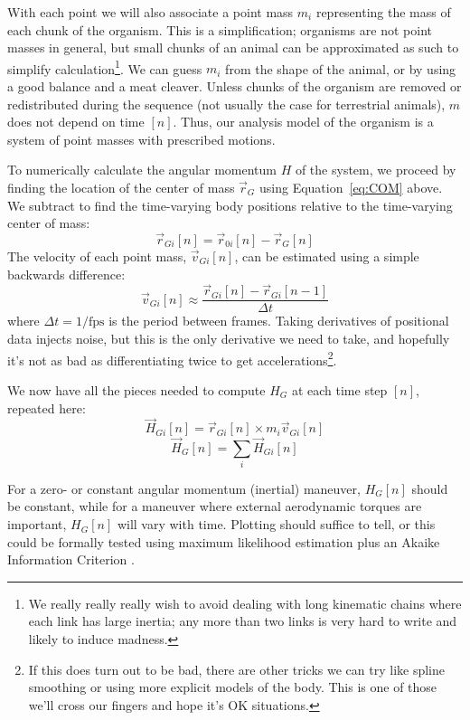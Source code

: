 \documentclass{amsart}
\begin{document}
With each point we will also associate a point mass $m_i$ representing the mass of each chunk of the organism. This is a simplification; organisms are not point masses in general, but small chunks of an animal can be approximated as such to simplify calculation\footnote{We really really really wish to avoid dealing with long kinematic chains where each link has large inertia; any more than two links is very hard to write and likely to induce madness.}. We can guess $m_i$ from the shape of the animal, or by using a good balance and a meat cleaver. Unless chunks of the organism are removed or redistributed during the sequence (not usually the case for terrestrial animals), $m$ does not depend on time $[n]$. Thus, our analysis model of the organism is a system of point masses with prescribed motions.  

To numerically calculate the angular momentum $H$ of the system, we proceed by finding the location of the center of mass $\vec{r}_G$ using Equation~\ref{eq:COM} above. We subtract to find the time-varying body positions relative to the time-varying center of mass:
\begin{equation}
\vec{r}_{Gi}[n] = \vec{r}_{0i}[n]-\vec{r}_{G}[n]
\label{eq:rg}
\end{equation}
The velocity of each point mass, $\vec{v}_{Gi}[n]$, can be estimated using a simple backwards difference:
\begin{equation}
\vec{v}_{Gi}[n] \approx \frac{\vec{r}_{Gi}[n] - \vec{r}_{Gi}[n-1]}{\Delta t}
\end{equation}
where $\Delta t = 1/\mbox{fps}$ is the period between frames. Taking derivatives of positional data injects noise, but this is the only derivative we need to take, and hopefully it's not as bad as differentiating twice to get accelerations\footnote{If this does turn out to be bad, there are other tricks we can try like spline smoothing or using more explicit models of the body. This is one of those we'll cross our fingers and hope it's OK situations.}. 

We now have all the pieces needed to compute $H_G$ at each time step $[n]$, repeated here: 
\begin{equation}
\vec{H}_{Gi}[n] = \vec{r}_{Gi}[n] \times m_i \vec{v}_{Gi}[n]
\end{equation}
\begin{equation}
\vec{H}_{G}[n] = \sum_i \vec{H}_{Gi}[n]
\end{equation}

For a zero- or constant angular momentum (inertial) maneuver, $H_G[n]$ should be constant, while for a maneuver where external aerodynamic torques are important, $H_G[n]$ will vary with time. Plotting should suffice to tell, or this could be formally tested using maximum likelihood estimation plus an Akaike Information Criterion \cite{notes:tdd}. 
\end{document}
